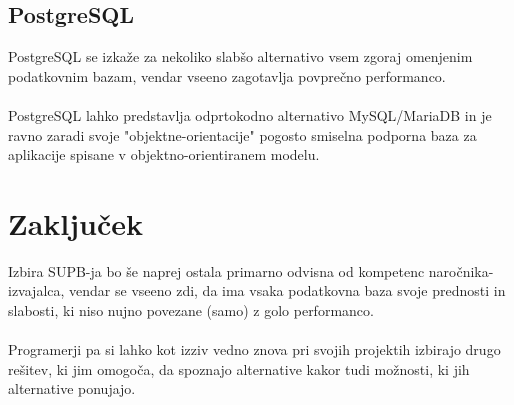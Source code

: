 \documentclass[a4paper,11pt]{report}
\begin{document}
\subsection{PostgreSQL}
PostgreSQL se izkaže za nekoliko slabšo alternativo vsem zgoraj omenjenim podatkovnim bazam, vendar vseeno zagotavlja povprečno performanco.
\\\\
PostgreSQL lahko predstavlja odprtokodno alternativo MySQL/MariaDB in je ravno zaradi svoje "objektne-orientacije" pogosto smiselna podporna baza za aplikacije spisane v objektno-orientiranem modelu.

\section{Zaključek}
Izbira SUPB-ja bo še naprej ostala primarno odvisna od kompetenc naročnika-izvajalca, vendar se vseeno zdi, da ima vsaka podatkovna baza svoje prednosti in slabosti, ki niso nujno povezane (samo) z golo performanco.
\\\\
Programerji pa si lahko kot izziv vedno znova pri svojih projektih izbirajo drugo rešitev, ki jim omogoča, da spoznajo alternative kakor tudi možnosti, ki jih alternative ponujajo.
\end{document}
